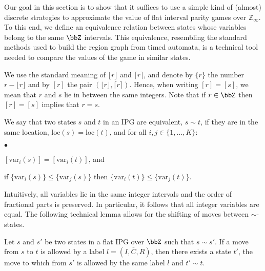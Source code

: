 \documentclass[fleqn,envcountsame]{LMCS}
\newcommand{\Zinf}{\ensuremath{\mathbb{Z}_{\infty}}}
\newcommand{\ol}[1]{\ensuremath{\overline{#1}}}
\newcommand{\floor}[1]{\ensuremath{\lfloor #1 \rfloor}}
\newcommand{\ceil}[1]{\ensuremath{\lceil #1 \rceil}}
\newcommand{\loc}{\ensuremath{\mathrm{loc}}} \newcommand{\var}{\ensuremath{\mathrm{var}}} \renewcommand\epsilon{\varepsilon}
\begin{document}
Our goal in this section is to show that it suffices to use a simple kind
of (almost) discrete strategies to approximate the value of flat 
interval parity games over $\Zinf$.
To this end, we define an equivalence relation between states
whose variables belong to the same $\bbZ$ intervals. This equivalence,
resembling the standard methods used to build the region graph from
timed automata, is a technical tool needed to compare the values of
the game in similar states. 

We use the standard meaning
of $\floor r$ and $\ceil r$, and denote by $\{r\}$ the number $r - \floor{r}$
and by $[r]$ the pair $(\floor r , \ceil r)$. Hence, when writing
$[r]=[s]$, we mean that $r$ and $s$ lie in between the same integers.
Note that if $r \in \bbZ$ then $[r] = [s]$ implies that $r = s$.

\begin{defi}
We say that two states $s$ and $t$ in an IPG are equivalent, $s \sim t$,
if they are in the same location, $\loc(s) = \loc(t)$, and for all
$i, j \in \{1, \ldots, K\}$:
\begin{iteMize}{$\bullet$}
\item $[\var_i(s)] = [\var_i(t)]$, and
\item if $\{ \var_i(s) \} \leq \{ \var_j(s) \}$ then $\{ \var_i(t) \} \leq \{ \var_j(t) \}$.
\end{iteMize}
\end{defi}

Intuitively, all variables lie in the same integer intervals and the order
of fractional parts is preserved. In particular, it follows that all
integer variables are equal.
The following technical lemma allows for the shifting of moves between $\sim$-states.

\begin{lem} \label{shift-move}
Let $s$ and $s'$ be two states in a flat IPG over $\bbZ$ such that $s \sim s'$.
If a move from $s$ to $t$ is allowed by a label $l = (I, \ol{C}, R)$,
then there exists a state $t'$, the move to which from $s'$ is allowed by
the same label $l$ and $t' \sim t$.
\end{lem}
\end{document}
